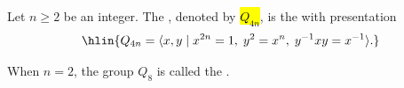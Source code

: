 \begin{definition} \label{definition:generalized_quaternion_group_of_order_4n}
Let $n \geq 2$ be an integer. The , denoted by \hl{$Q_{4n}$}, is the  with presentation
$$\hlin{Q_{4n} = \langle x, y \mid x^{2n} = 1,\; y^2 = x^n,\; y^{-1}xy = x^{-1} \rangle.}$$

When $n=2$, the group $Q_8$ is called the .
\end{definition}
